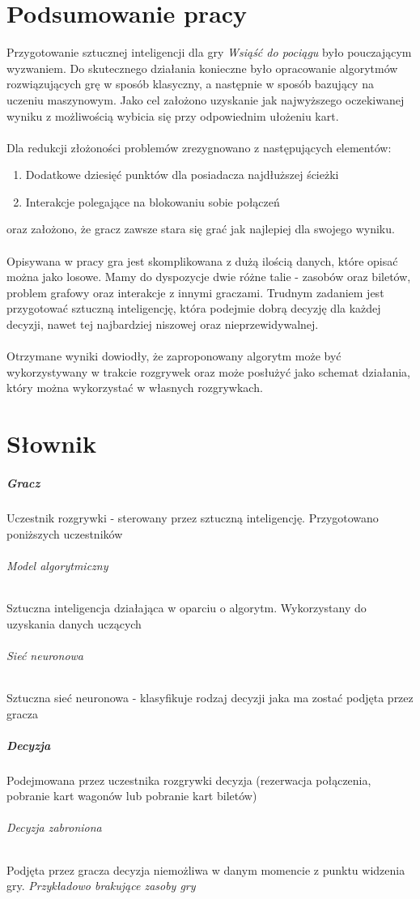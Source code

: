 \documentclass[12pt, oneside]{report}
\begin{document}
\chapter{Podsumowanie pracy}
Przygotowanie sztucznej inteligencji dla gry \textit{Wsiąść do pociągu} było pouczającym wyzwaniem. Do skutecznego działania konieczne było opracowanie algorytmów rozwiązujących grę w sposób klasyczny, a następnie w sposób bazujący na uczeniu maszynowym. Jako cel założono uzyskanie jak najwyższego oczekiwanej wyniku z możliwością wybicia się przy odpowiednim ułożeniu kart. \\ \\ 
Dla redukcji złożoności problemów zrezygnowano z następujących elementów:
\begin{enumerate}
	\item Dodatkowe dziesięć punktów dla posiadacza najdłuższej ścieżki
	\item Interakcje polegające na blokowaniu sobie połączeń
\end{enumerate}
oraz założono, że gracz zawsze stara się grać jak najlepiej dla swojego wyniku. \\ \\  
Opisywana w pracy gra jest skomplikowana z dużą ilością danych, które opisać można jako losowe. Mamy do dyspozycje dwie różne talie - zasobów oraz biletów, problem grafowy oraz interakcje z innymi graczami. Trudnym zadaniem jest przygotować sztuczną inteligencję, która podejmie dobrą decyzję dla każdej decyzji, nawet tej najbardziej niszowej oraz nieprzewidywalnej. \\ \\ 
Otrzymane wyniki dowiodły, że zaproponowany algorytm może być wykorzystywany w trakcie rozgrywek oraz może posłużyć jako schemat działania, który można wykorzystać w własnych rozgrywkach. 
\chapter{Słownik}
\label{chap:dictionary}
\paragraph{Gracz}
Uczestnik rozgrywki - sterowany przez sztuczną inteligencję. Przygotowano poniższych uczestników
\subparagraph{Model algorytmiczny} Sztuczna inteligencja działająca w oparciu o algorytm. Wykorzystany do uzyskania danych uczących
\subparagraph{Sieć neuronowa} Sztuczna sieć neuronowa - klasyfikuje rodzaj decyzji jaka ma zostać podjęta przez gracza
\paragraph{Decyzja}
Podejmowana przez uczestnika rozgrywki decyzja (rezerwacja połączenia, pobranie kart wagonów lub pobranie kart biletów)
\subparagraph{Decyzja zabroniona}
Podjęta przez gracza decyzja niemożliwa w danym momencie z punktu widzenia gry. \textit{Przykładowo brakujące zasoby gry}
\end{document}
